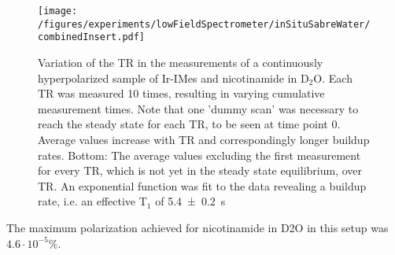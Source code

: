         \begin{figure}
            \texttt{[image: /figures/experiments/lowFieldSpectrometer/inSituSabreWater/combinedInsert.pdf]}
            \caption[TR variation]{Variation of the TR in the measurements of a continuously hyperpolarized sample of Ir-IMes and nicotinamide in D$_2$O. Each TR was measured 10 times, resulting in varying cumulative measurement times. Note that one 'dummy scan' was necessary to reach the steady state for each TR, to be seen at time point 0. Average values increase with TR and correspondingly longer buildup rates. Bottom: The average values excluding the first measurement for every TR, which is not yet in the steady state equilibrium, over TR. An exponential function was fit to the data revealing a buildup rate, i.e. an effective T$_1$ of \SI{5.4\pm 0.2}{\second}}
            \label{fig:results:lowFieldSpectrometer:TRvariation}
        \end{figure}
        The maximum polarization achieved for nicotinamide in D2O in this setup was $4.6\cdot 10^{-5}\si{\percent}$.
